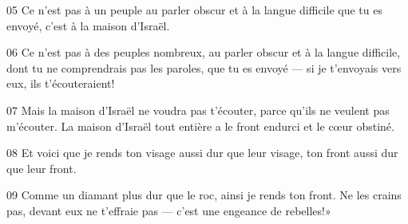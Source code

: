 
05 Ce n’est pas à un peuple au parler obscur et à la langue difficile que tu es envoyé, c’est à la maison d’Israël.

06 Ce n’est pas à des peuples nombreux, au parler obscur et à la langue difficile, dont tu ne comprendrais pas les paroles, que tu es envoyé --- si je t’envoyais vers eux, ils t’écouteraient!

07 Mais la maison d’Israël ne voudra pas t’écouter, parce qu’ils ne veulent pas m’écouter. La maison d’Israël tout entière a le front endurci et le cœur obstiné.

08 Et voici que je rends ton visage aussi dur que leur visage, ton front aussi dur que leur front.

09 Comme un diamant plus dur que le roc, ainsi je rends ton front. Ne les crains pas, devant eux ne t’effraie pas --- c’est une engeance de rebelles!»

